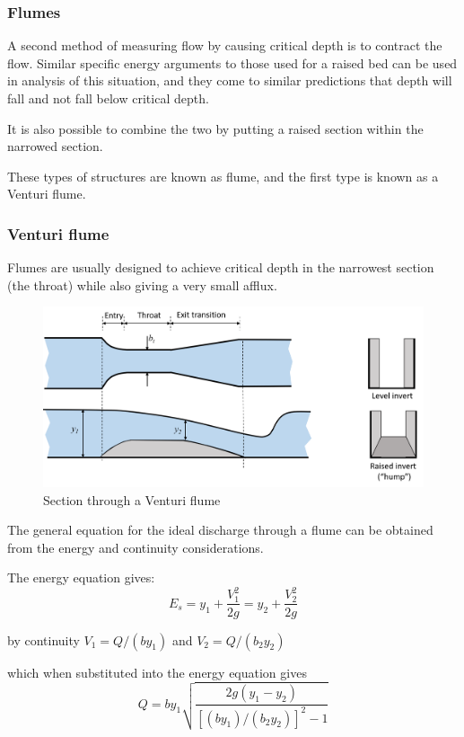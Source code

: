 \documentclass[a4paper, 12pt, british]{article} %
\numberwithin{equation}{section}
\numberwithin{figure}{section}
\numberwithin{table}{section}
\begin{document}
\subsubsection{Flumes} 
A second method of measuring flow by causing critical depth is to contract the flow. Similar specific energy arguments to those used for a raised bed can be used in analysis of this situation, and they come to similar predictions that depth will fall and not fall below critical depth.

It is also possible to combine the two by putting a raised section within the narrowed section.

These types of structures are known as flume, and the first type is known as a Venturi flume.

\subsubsection{Venturi flume}

Flumes are usually designed to achieve critical depth in the narrowest section (the throat) while also giving a very small afflux.

\begin{figure}[H]
	\centering
	\includegraphics[scale=0.5]{./images/venturi_flume.png}
	\caption{Section through a Venturi flume}
	\label{fig:1191}
\end{figure}


The general equation for the ideal discharge through a flume can be obtained from the energy and continuity considerations.

The energy equation gives:
\begin{equation*}
E_s = y_1  + \frac{  V_1^2}{2g} = y_2  + \frac{  V_2^2}{2g} 
\end{equation*}

by continuity $V_1 = Q/(by_1) $ and $V_2 = Q/(b_2 y_2)$

which when substituted into the energy equation gives
\begin{equation*}
Q = b y_1 \sqrt{\frac{2g(y_1-y_2)}{[(b y_1) / (b_2 y_2)]^2 - 1}}
\end{equation*}
\end{document}
